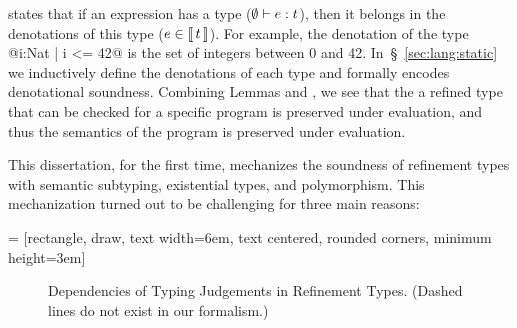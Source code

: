  states that if an expression has a type (${\emptyset} \vdash {e} : {t}$),
then it belongs in the denotations of this type ($e \in \llbracket\, t \,\rrbracket$).
For example, the denotation of the type @{i:Nat | i <= 42}@ is the set of integers
between 0 and 42.
%
In~\S~\ref{sec:lang:static} we inductively define the denotations of each type and
 formally encodes denotational soundness.
Combining Lemmas  and ,
we see that the a refined \sysrf type that can be checked for a specific program
is preserved under evaluation, and thus the semantics of the program is 
preserved under evaluation.

This dissertation, for the first time, mechanizes the soundness of refinement types with
semantic subtyping, existential types, and polymorphism.
This mechanization turned out to be challenging for three main reasons:

 = [rectangle, draw,
    text width=6em, text centered, rounded corners, minimum height=3em]
\begin{figure}
\caption{Dependencies of Typing Judgements in Refinement Types. (Dashed lines do not exist in our formalism.) }
\label{fig:dependencies}
\end{figure}

